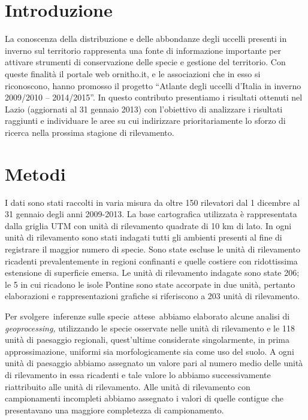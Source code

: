 \section*{Introduzione}

La conoscenza della distribuzione e delle abbondanze degli uccelli
presenti in inverno sul territorio rappresenta una fonte di
informazione importante per attivare strumenti di conservazione delle
specie e gestione del territorio. Con queste finalit\`a il portale web
ornitho.it, e le associazioni che in esso si riconoscono, hanno
promosso il progetto  {\textquotedblleft}Atlante degli uccelli
d{\textquoteright}Italia in inverno 2009/2010 --
2014/2015{\textquotedblright}. In questo contributo presentiamo i
risultati ottenuti nel Lazio (aggiornati al 31 gennaio 2013) con
l{\textquoteright}obiettivo di analizzare i risultati raggiunti e
individuare le aree su cui indirizzare
prioritariamente lo sforzo di ricerca nella prossima stagione di
rilevamento.

\section*{Metodi}

I dati sono stati raccolti in varia misura da oltre 150 rilevatori dal
1{\textdegree} dicembre al 31 gennaio degli anni 2009-2013. La base
cartografica utilizzata \`e rappresentata dalla griglia UTM con unit\`a
di rilevamento quadrate di 10 km di lato. In ogni
unit\`a di rilevamento sono stati indagati tutti gli ambienti presenti
al fine di registrare il maggior numero di specie. Sono state escluse
le unit\`a di rilevamento ricadenti prevalentemente in regioni
confinanti e quelle costiere con ridottissima
estensione di superficie emersa. Le unit\`a di rilevamento indagate
sono state 206; le 5 in cui ricadono le isole Pontine sono state
accorpate in due unit\`a, pertanto elaborazioni e rappresentazioni
grafiche si riferiscono a 203 unit\`a di rilevamento. 

Per svolgere~inferenze sulle specie~attese~abbiamo elaborato alcune
analisi di \textit{geoprocessing,} utilizzando le specie osservate
nelle unit\`a di rilevamento e le 118 unit\`a di paesaggio regionali,
quest{\textquoteright}ultime considerate singolarmente, in prima
approssimazione, uniformi sia morfologicamente sia come uso del suolo.
A ogni unit\`a di paesaggio abbiamo assegnato un
valore pari al numero medio delle unit\`a di rilevamento in
essa ricadenti e tale valore lo
abbiamo successivamente riattribuito alle unit\`a di
rilevamento. Alle unit\`a di rilevamento con campionamenti incompleti
abbiamo assegnato i valori di quelle contigue che presentavano una
maggiore completezza di campionamento.

